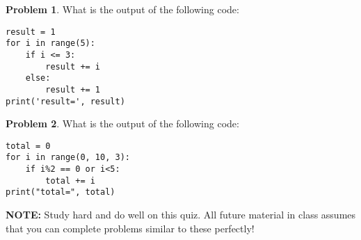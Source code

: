 \documentclass[10pt]{article}
\theoremstyle{definition}
\newtheorem{problem}{Problem}
\begin{document}
\begin{problem}
    What is the output of the following code:
\end{problem}
\begin{lstlisting}
result = 1
for i in range(5):
    if i <= 3:
        result += i
    else:
        result += 1
print('result=', result)
\end{lstlisting}
\vspace{2in}


\begin{problem}
    What is the output of the following code:
\end{problem}
\begin{lstlisting}
total = 0
for i in range(0, 10, 3):
    if i%2 == 0 or i<5:
        total += i
print("total=", total)
\end{lstlisting}
\vspace{2in}

{
    \noindent
    \Large
    \textbf{NOTE:}
    Study hard and do well on this quiz.
    All future material in class assumes that you can complete problems similar to these perfectly!
}
\end{document}
